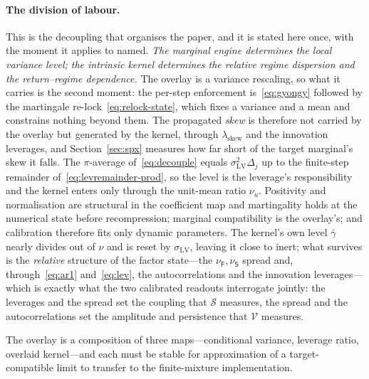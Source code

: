\documentclass[11pt]{article}
\providecommand{\1}{\mathbf 1}
\begin{document}
\paragraph{The division of labour.} This is the decoupling that organises the paper, and it is
stated here once, with the moment it applies to named. \emph{The marginal engine determines the
local variance level; the intrinsic kernel determines the relative regime dispersion and the
return--regime dependence.} The overlay is a variance rescaling, so what it carries is the second
moment: the per-step enforcement is~\eqref{eq:gyongy} followed by the martingale
re-lock~\eqref{eq:relock-state}, which fixes a variance and a mean and constrains nothing beyond them.
The propagated \emph{skew} is therefore not carried by the overlay but generated by the kernel,
through $\lambda_{\mathrm{skew}}$ and the innovation leverages, and Section~\ref{sec:spx} measures
how far short of the target marginal's skew it falls. The
$\pi$-average of~\eqref{eq:decouple} equals $\sigma^2_{\mathrm{LV}}\Delta_j$ up to the finite-step
remainder of~\eqref{eq:levremainder-prod}, so the level is the leverage's responsibility and the kernel
enters only through the unit-mean ratio $\nu_u$.
Positivity and normalisation are structural in the coefficient map and martingality holds at the
numerical state before recompression; marginal compatibility is the overlay's; and calibration therefore fits only dynamic
parameters. The kernel's own level $\bar\gamma$ nearly divides out of $\nu$ and is reset by
$\sigma_{\mathrm{LV}}$, leaving it close to inert; what survives is the \emph{relative} structure of
the factor state---the $\nu_{\mathsf F},\nu_{\mathsf S}$ spread and, through~\eqref{eq:ar1}
and~\eqref{eq:lev}, the autocorrelations and the innovation leverages---which is exactly what the
two calibrated readouts interrogate jointly: the leverages and the spread set the coupling that
$\mathcal S$ measures, the spread and the autocorrelations set the amplitude and persistence that
$\mathcal V$ measures.

The overlay is a composition of three maps---conditional variance, leverage ratio, overlaid
kernel---and each must be stable for approximation of a target-compatible limit to transfer to the
finite-mixture implementation.
\end{document}
